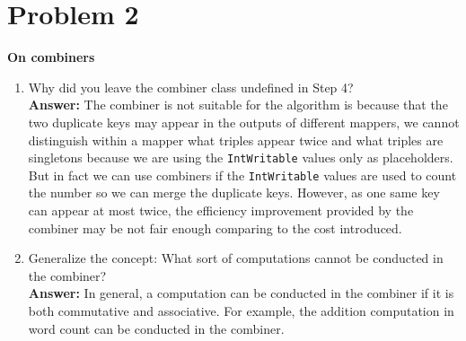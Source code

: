 \documentclass[letterpaper, 11pt]{article}
\begin{document}
\section*{Problem 2}
\textbf{On combiners}
\begin{enumerate}
    \item Why did you leave the combiner class undefined in Step 4?\\
        \textbf{Answer:} The combiner is not suitable for the algorithm is because that the two duplicate keys may appear in the outputs of different mappers, we cannot distinguish within a mapper what triples appear twice and what triples are singletons because we are using the \texttt{IntWritable} values only as placeholders. But in fact we can use combiners if the \texttt{IntWritable} values are used to count the number so we can merge the duplicate keys. However, as one same key can appear
        at most twice, the efficiency improvement provided by the combiner may be not fair enough comparing to the cost introduced.
    \item Generalize the concept: What sort of computations cannot be conducted in the combiner?\\
        \textbf{Answer:} In general, a computation can be conducted in the combiner if it is both commutative and associative. For example, the addition computation in word count can be conducted in the combiner.
\end{enumerate}
\end{document}
